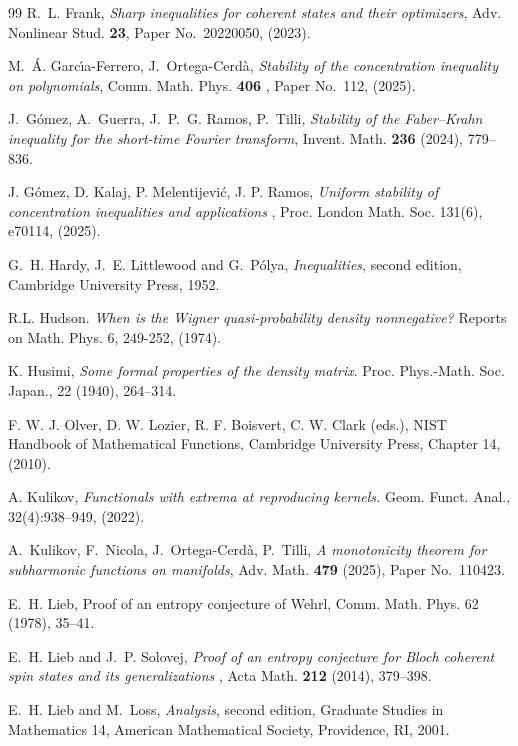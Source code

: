 \documentclass[12pt]{amsart}
\theoremstyle{plain}
\theoremstyle{definition}
\theoremstyle{remark}
\numberwithin{equation}{section}
\newcommand{\1}{\mathbf 1}
\begin{document}
\begin{thebibliography}{99}
 {\small R.~L. Frank, \emph{Sharp inequalities for coherent
states and their optimizers}, Adv. Nonlinear Stud. \textbf{23}, Paper
No.~20220050, (2023). }

 {\small M.~\'{A}. Garc\'{\i}a-Ferrero, J.~Ortega-Cerd\`{a}, 
\emph{Stability of the concentration inequality on polynomials}, Comm. Math.
Phys. \textbf{406} , Paper No.~112, (2025). }

 {\small J.~G\'{o}mez, A.~Guerra, J.~P.~G. Ramos, P.~Tilli, 
\emph{Stability of the Faber--Krahn inequality for the short-time Fourier
transform}, Invent. Math. \textbf{236} (2024), 779--836. }

 {\small J. G\'{o}mez, D. Kalaj, P. Melentijevi\'{c}, J. P.
Ramos, \emph{Uniform stability of concentration inequalities and applications%
}, Proc. London Math. Soc. 131(6), e70114, (2025).}

 {\small G.~H. Hardy, J.~E. Littlewood and G.~P\'{o}lya, \emph{%
Inequalities}, second edition, Cambridge University Press, 1952. }

 {\small R.L. Hudson. \emph{When is the Wigner
quasi-probability density nonnegative?} Reports on Math. Phys. 6, 249-252,
(1974).}

 {\small K. Husimi, \emph{Some formal properties of the
density matrix}. Proc. Phys.-Math. Soc. Japan., 22 (1940), 264--314.}

 {\small F. W. J. Olver, D. W. Lozier, R. F.
Boisvert, C. W. Clark (eds.), NIST Handbook of Mathematical Functions,
Cambridge University Press, Chapter 14, (2010).}

 {\small A. Kulikov, \emph{Functionals with extrema at
reproducing kernels.} Geom. Funct. Anal., 32(4):938--949, (2022).}

 {\small A.~Kulikov, F.~Nicola, J.~Ortega-Cerd\`{a}, P.~Tilli, 
\emph{A monotonicity theorem for subharmonic functions on manifolds}, Adv.
Math. \textbf{479} (2025), Paper No.~110423. }

 {\small E.~H. Lieb, \newblock Proof of an entropy
conjecture of Wehrl, \newblock Comm. Math. Phys. 62 (1978), 35--41.}

 {\small E.~H. Lieb and J.~P. Solovej, \emph{Proof of
an entropy conjecture for Bloch coherent spin states and its generalizations}%
, Acta Math. \textbf{212} (2014), 379--398. }

 {\small E.~H. Lieb and M.~Loss, \emph{Analysis}, second
edition, Graduate Studies in Mathematics 14, American Mathematical Society,
Providence, RI, 2001. }


\end{thebibliography}
\end{document}
